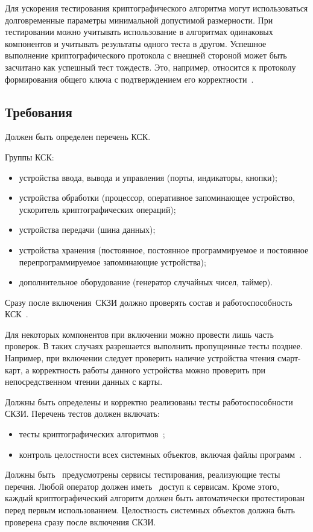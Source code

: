Для ускорения тестирования криптографического алгоритма
могут использоваться долговременные параметры минимальной допустимой 
размерности. При тестировании можно учитывать 
использование в алгоритмах одинаковых компонентов и учитывать результаты
одного теста в другом. Успешное выполнение 
криптографического протокола с внешней стороной может быть засчитано
как успешный тест тождеств. Это, например, относится к протоколу 
формирования общего ключа с подтверждением его корректности~.


\subsection{Требования}\label{ST.Reqs}

\label{R.ST.CSCList}
Должен быть определен перечень КСК.

Группы КСК:
\begin{itemize}
\item
устройства ввода, вывода и управления (порты, индикаторы, кнопки);
\item
устройства обработки (процессор, оперативное запоминающее устройство, 
ускоритель криптографических операций); 
\item
устройства передачи (шина данных);
\item
устройства хранения (постоянное, постоянное программируемое и постоянное 
перепрограммируемое запоминающие устройства); 
\item
дополнительное оборудование (генератор случайных чисел, таймер). 
\end{itemize}
\fi

\label{R.ST.CSCTests}
Сразу после включения~СКЗИ должно проверять состав 
и работоспособность КСК~.

\begin{note}
Для некоторых компонентов при включении можно провести лишь часть 
проверок. В таких случаях разрешается выполнить пропущенные тесты позднее. 
Например, при включении следует проверить наличие устройства чтения 
смарт-карт, а корректность работы данного устройства можно проверить при 
непосредственном чтении данных с карты. 
\end{note}

\label{R.ST.Tests}
Должны быть определены и корректно реализованы тесты работоспособности СКЗИ.
Перечень тестов должен включать:
\begin{itemize}
\item
тесты криптографических алгоритмов~;
\item
контроль целостности всех системных объектов, включая файлы 
программ~.
\end{itemize}
Должны быть~ предусмотрены сервисы тестирования, реализующие
тесты перечня. Любой оператор должен иметь~ доступ к 
сервисам.
%
Кроме этого, каждый криптографический алгоритм должен быть автоматически 
протестирован перед первым использованием.
%
Целостность системных объектов должна быть проверена сразу после включения 
СКЗИ.

